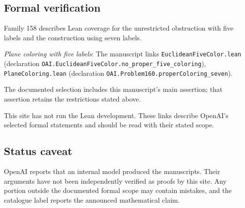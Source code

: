 \documentclass[11pt]{article}
\begin{document}
\subsection{Formal verification}
Family 158 describes Lean coverage for the unrestricted obstruction with five labels and the construction using seven labels.

\textit{Plane coloring with five labels}: The manuscript links \texttt{EuclideanFiveColor.lean} (declaration \texttt{OAI.EuclideanFiveColor.no\_proper\_five\_coloring}), \texttt{PlaneColoring.lean} (declaration \texttt{OAI.Problem160.properColoring\_seven}).

The documented selection includes this manuscript’s main assertion; that assertion retains the restrictions stated above.

This site has not run the Lean development. These links describe OpenAI’s selected formal statements and should be read with their stated scope.

\subsection{Status caveat}
OpenAI reports that an internal model produced the manuscripts. Their arguments have not been independently verified as proofs by this site. Any portion outside the documented formal scope may contain mistakes, and the catalogue label reports the announced mathematical claim.
\end{document}
